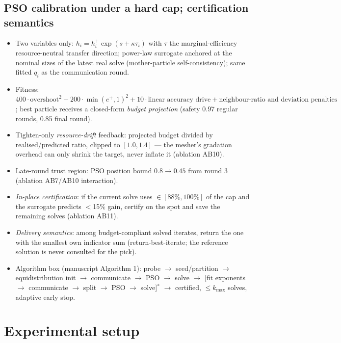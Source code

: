 \documentclass[preprint,12pt]{elsarticle}
\newenvironment{plan}{\begin{itemize}\setlength\itemsep{0.15em}}{\end{itemize}}
\begin{document}
\subsection{PSO calibration under a hard cap; certification semantics}
\begin{plan}
  \item Two variables only: $h_i = h_i^{+}\exp(s+\kappa\tau_i)$ with $\tau$ the
        marginal-efficiency resource-neutral transfer direction; power-law surrogate
        anchored at the nominal sizes of the latest real solve (mother-particle
        self-consistency); same fitted $q_i$ as the communication round.
  \item Fitness: $400\cdot\text{overshoot}^2 + 200\cdot\min(e^{+},1)^2 +
        10\cdot\text{linear accuracy drive} + \text{neighbour-ratio and deviation
        penalties}$; best particle receives a closed-form \emph{budget projection}
        (safety 0.97 regular rounds, 0.85 final round).
  \item Tighten-only \emph{resource-drift} feedback: projected budget divided by
        realised/predicted ratio, clipped to $[1.0,1.4]$ --- the mesher's gradation
        overhead can only shrink the target, never inflate it (ablation AB10).
  \item Late-round trust region: PSO position bound $0.8 \to 0.45$ from round 3
        (ablation AB7/AB10 interaction).
  \item \emph{In-place certification}: if the current solve uses $\in[88\%,100\%]$ of
        the cap and the surrogate predicts $<$15\% gain, certify on the spot and save
        the remaining solves (ablation AB11).
  \item \emph{Delivery semantics}: among budget-compliant solved iterates, return the
        one with the smallest own indicator sum (return-best-iterate; the reference
        solution is never consulted for the pick).
  \item Algorithm box (manuscript Algorithm 1): probe $\to$ seed/partition $\to$
        equidistribution init $\to$ communicate $\to$ PSO $\to$ solve $\to$
        [fit exponents $\to$ communicate $\to$ split $\to$ PSO $\to$ solve]$^{*}$
        $\to$ certified, $\le k_{\max}$ solves, adaptive early stop.
\end{plan}

\section{Experimental setup}\label{sec:setup}
\end{document}
